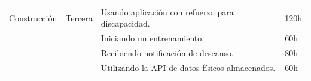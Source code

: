 \begin{longtable}[c]{@{}llll@{}}
\begin{minipage}[t]{0.17\columnwidth}
Construcción
\end{minipage} & \begin{minipage}[t]{0.12\columnwidth}\raggedright
Tercera
\end{minipage} & \begin{minipage}[t]{0.58\columnwidth}\raggedright
Usando aplicación con refuerzo para discapacidad.
\end{minipage} & \begin{minipage}[t]{0.12\columnwidth}\raggedright
120h
\end{minipage}
\\\noalign{\medskip}
\begin{minipage}[t]{0.17\columnwidth}\raggedright
\end{minipage} & \begin{minipage}[t]{0.12\columnwidth}\raggedright
\end{minipage} & \begin{minipage}[t]{0.58\columnwidth}\raggedright
Iniciando un entrenamiento.
\end{minipage} & \begin{minipage}[t]{0.12\columnwidth}\raggedright
60h
\end{minipage}
\\\noalign{\medskip}
\begin{minipage}[t]{0.17\columnwidth}\raggedright
\end{minipage} & \begin{minipage}[t]{0.12\columnwidth}\raggedright
\end{minipage} & \begin{minipage}[t]{0.58\columnwidth}\raggedright
Recibiendo notificación de descanso.
\end{minipage} & \begin{minipage}[t]{0.12\columnwidth}\raggedright
80h
\end{minipage}
\\\noalign{\medskip}
\begin{minipage}[t]{0.17\columnwidth}\raggedright
\end{minipage} & \begin{minipage}[t]{0.12\columnwidth}\raggedright
\end{minipage} & \begin{minipage}[t]{0.58\columnwidth}\raggedright
Utilizando la API de datos físicos almacenados.
\end{minipage} & \begin{minipage}[t]{0.12\columnwidth}\raggedright
60h
\end{minipage}

\end{longtable}
